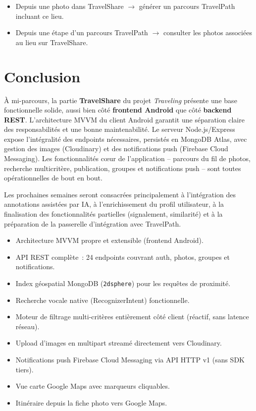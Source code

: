 \documentclass[12pt, a4paper, openany]{report}
\begin{document}
\begin{itemize}
  \item Depuis une photo dans TravelShare $\rightarrow$ générer un parcours TravelPath
    incluant ce lieu.
  \item Depuis une étape d'un parcours TravelPath $\rightarrow$ consulter les photos
    associées au lieu sur TravelShare.
\end{itemize}

\chapter{Conclusion}

À mi-parcours, la partie \textbf{TravelShare} du projet \emph{Traveling} présente une base
fonctionnelle solide, aussi bien côté \textbf{frontend Android} que côté \textbf{backend REST}.
L'architecture MVVM du client Android garantit une séparation claire des responsabilités et
une bonne maintenabilité. Le serveur Node.js/Express expose l'intégralité des endpoints
nécessaires, persistés en MongoDB Atlas, avec gestion des images (Cloudinary) et des
notifications push (Firebase Cloud Messaging). Les fonctionnalités cœur de l'application
-- parcours du fil de photos, recherche multicritère, publication, groupes et notifications
push -- sont toutes opérationnelles de bout en bout.

Les prochaines semaines seront consacrées principalement à l'intégration des annotations
assistées par IA, à l'enrichissement du profil utilisateur, à la finalisation des
fonctionnalités partielles (signalement, similarité) et à la préparation de la passerelle
d'intégration avec TravelPath.

\begin{successbox}
\begin{itemize}[noitemsep]
  \item Architecture MVVM propre et extensible (frontend Android).
  \item API REST complète~: 24 endpoints couvrant auth, photos, groupes et notifications.
  \item Index géospatial MongoDB (\texttt{2dsphere}) pour les requêtes de proximité.
  \item Recherche vocale native (RecognizerIntent) fonctionnelle.
  \item Moteur de filtrage multi-critères entièrement côté client (réactif, sans latence réseau).
  \item Upload d'images en multipart streamé directement vers Cloudinary.
  \item Notifications push Firebase Cloud Messaging via API HTTP v1 (sans SDK tiers).
  \item Vue carte Google Maps avec marqueurs cliquables.
  \item Itinéraire depuis la fiche photo vers Google Maps.
\end{itemize}
\end{successbox}
\end{document}
